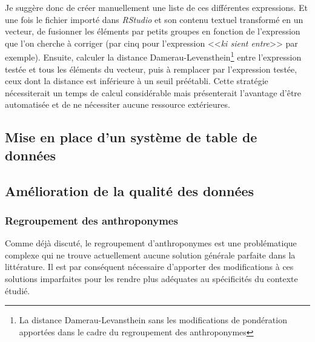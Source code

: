 Je suggère donc de créer manuellement une liste de ces différentes expressions. Et une fois le fichier importé dans \textit{RStudio} et son contenu textuel transformé en un vecteur, de fusionner les éléments par petits groupes en fonction de l'expression que l'on cherche à corriger (par cinq pour l'expression <<\textit{ki sient entre}>> par exemple). 
Ensuite, calculer la distance Damerau-Levensthein\footnote{La distance Damerau-Levansthein sans les modifications de pondération apportées dans le cadre du regroupement des anthroponymes} entre l'expression testée et tous les éléments du vecteur, puis à remplacer par l'expression testée, ceux dont la distance est inférieure à un seuil préétabli. %
Cette stratégie nécessiterait un temps de calcul considérable mais présenterait l'avantage d'être automatisée et de ne nécessiter aucune ressource extérieures.

\subsection{Mise en place d'un système de table de données}
\subsection{Amélioration de la qualité des données}
\subsubsection{Regroupement des anthroponymes}
Comme déjà discuté, le regroupement d'anthroponymes est une problématique complexe qui ne trouve actuellement aucune solution générale parfaite dans la littérature. Il est par conséquent nécessaire d'apporter des modifications à ces solutions imparfaites pour les rendre plus adéquates au spécificités du contexte étudié.

